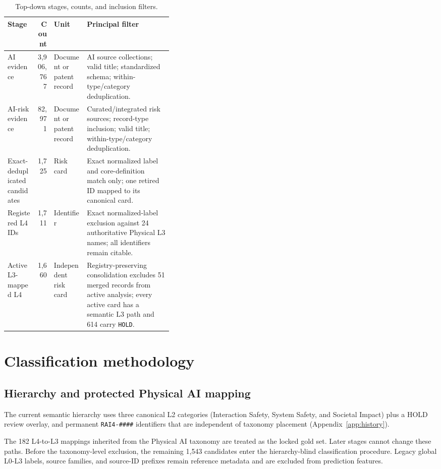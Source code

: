 \documentclass[11pt,a4paper]{article}
\newcommand{\code}[1]{\texttt{#1}}
\begin{document}
\begin{table}[H]
\centering
\caption{Top-down stages, counts, and inclusion filters.}
\label{tab:funnel}
\small
\begin{tabularx}{\linewidth}{L{0.18\linewidth}r L{0.20\linewidth}Y}
\toprule
Stage & Count & Unit & Principal filter \\
\midrule
AI evidence & 3,906,767 & Document or patent record & AI source collections; valid title; standardized schema; within-type/category deduplication. \\
AI-risk evidence & 82,971 & Document or patent record & Curated/integrated risk sources; record-type inclusion; valid title; within-type/category deduplication. \\
Exact-deduplicated candidates & 1,725 & Risk card & Exact normalized label and core-definition match only; one retired ID mapped to its canonical card. \\
Registered L4 IDs & 1,711 & Identifier & Exact normalized-label exclusion against 24 authoritative Physical L3 names; all identifiers remain citable. \\
Active L3-mapped L4 & 1,660 & Independent risk card & Registry-preserving consolidation excludes 51 merged records from active analysis; every active card has a semantic L3 path and 614 carry \code{HOLD}. \\
\bottomrule
\end{tabularx}
\end{table}

\section{Classification methodology}
\label{sec:methods}

\subsection{Hierarchy and protected Physical AI mapping}

The current semantic hierarchy uses three canonical L2 categories (Interaction
Safety, System Safety, and Societal Impact) plus a HOLD review overlay, and permanent
\code{RAI4-\#\#\#\#} identifiers that are independent of taxonomy placement
(Appendix~\ref{app:history}).

The 182 L4-to-L3 mappings inherited from the Physical AI taxonomy are treated
as the locked gold set. Later stages cannot change these paths. Before the
taxonomy-level exclusion, the remaining 1,543 candidates enter the
hierarchy-blind classification procedure. Legacy global
L0-L3 labels, source families, and source-ID prefixes remain reference metadata
and are excluded from prediction features.
\end{document}
